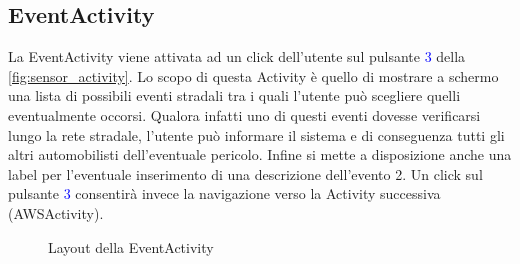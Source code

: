 \subsection{EventActivity}
\label{subsec:event_activity}
La EventActivity viene attivata ad un click dell'utente sul pulsante \textcolor{blue}{3} della \autoref{fig:sensor_activity}. Lo scopo di questa Activity è quello di mostrare a schermo una lista di possibili eventi stradali tra i quali l'utente può scegliere quelli eventualmente occorsi. Qualora infatti uno di questi eventi dovesse verificarsi lungo la rete stradale, l'utente può informare il sistema e di conseguenza tutti gli altri automobilisti dell'eventuale pericolo.
Infine si mette a disposizione anche una label per l'eventuale inserimento di una descrizione dell'evento \textcolor{mypink}{2}. Un click sul pulsante \textcolor{blue}{3} consentirà invece la navigazione verso la Activity successiva (AWSActivity).
\begin{figure}%
	\centering
	\qquad
	\caption{Layout della EventActivity}%
	\label{fig:event_activity}%
\end{figure}
